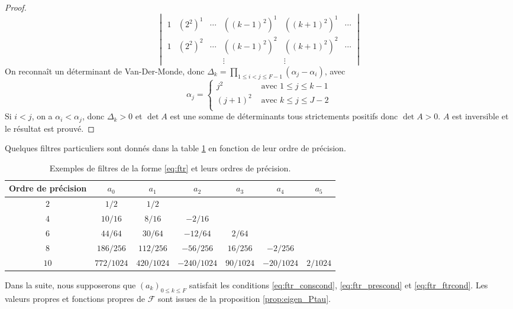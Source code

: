 \begin{proof}
\begin{equation}
\begin{vmatrix}
1 & (2^2)^1 & \cdots & ((k-1)^2)^1 & ((k+1)^2)^1 & \cdots\\
1 & (2^2)^2 & \cdots & ((k-1)^2)^2 & ((k+1)^2)^2 & \cdots\\
&&& \vdots &  \vdots &
\end{vmatrix}
\end{equation}
On reconnaît un déterminant de Van-Der-Monde, donc $\Delta_k = \prod_{1 \leq i < j \leq F-1} \left( \alpha_j - \alpha_i \right)$, avec 
\begin{equation}
\alpha_j = \left\lbrace
\begin{array}{ll}
j^2 & \text{ avec } 1 \leq j \leq k-1\\
(j+1)^2 & \text{ avec } k \leq j \leq J-2\\
\end{array}
\right.
\end{equation}
Si $i<j$, on a $\alpha_i < \alpha_j$, donc $\Delta_k>0$ et $\det A$ est une somme de déterminants tous strictements positifs donc $\det A > 0$. $A$ est inversible et le résultat est prouvé.
\end{proof}
Quelques filtres particuliers sont donnés dans la table \ref{tab:filter} en fonction de leur ordre de précision.
\begin{table}[htbp]
\begin{center}
\begin{tabular}{|c||cccccc|}
\hline
\textbf{Ordre de précision} & $a_0$ & $a_1$ & $a_2$ & $a_3$ & $a_4$ & $a_5$ \\
\hline \hline
$2$ & $1/2$ & $1/2$ & & & & \\
\hline
$4$ & $10/16$ & $8/16$ & $-2/16$ & & & \\
\hline
$6$ & $44/64$ & $30/64$ & $-12/64$ & $2/64$ & & \\
\hline
$8$ & $186/256$ & $112/256$ & $-56/256$ & $16/256$ & $-2/256$ & \\
\hline
$10$ & $772/1024$ & $420/1024$ & $-240/1024$ & $90/1024$ & $-20/1024$ & $2/1024$ \\
\hline
\end{tabular}
\end{center}
\caption{Exemples de filtres de la forme \eqref{eq:ftr} et leurs ordres de précision.}
\label{tab:filter}
\end{table}
Dans la suite, nous supposerons que $(a_k)_{0 \leq k \leq F}$ satisfait les conditions \eqref{eq:ftr_conscond}, \eqref{eq:ftr_prescond} et \eqref{eq:ftr_ftrcond}.
Les valeurs propres et fonctions propres de $\mathcal{F}$ sont issues de la proposition \ref{prop:eigen_Ptau}.

